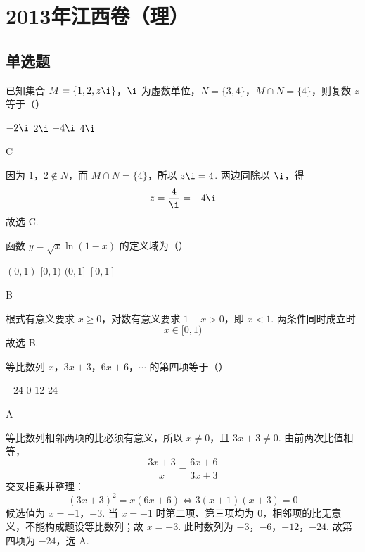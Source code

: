 \chapter{2013年江西卷（理）}

\section{单选题}

\begin{problem}
已知集合 \(M = \{1, 2, z\i\}\)，\(\i\) 为虚数单位，\(N = \{3, 4\}\)，\(M \cap N = \{4\}\)，则复数 \(z\) 等于（\quad）

\choices
    {\(-2\i\)}
    {\(2\i\)}
    {\(-4\i\)}
    {\(4\i\)}
\end{problem}

\begin{answer}
C
\end{answer}

\begin{solution}
因为 \(1\)，\(2\notin N\)，而 \(M\cap N=\{4\}\)，所以 \(z\i=4\). 两边同除以 \(\i\)，得
\[
z=\frac{4}{\i}=-4\i
\]
故选 C.
\end{solution}

\begin{problem}
函数 \( y = \sqrt{x} \ln (1 - x) \) 的定义域为（\quad）

\choices
    {\((0,1)\)}
    {\([0,1)\)}
    {\((0,1]\)}
    {\([0,1]\)}
\end{problem}

\begin{answer}
B
\end{answer}

\begin{solution}
根式有意义要求 \(x\geqslant0\)，对数有意义要求 \(1-x>0\)，即 \(x<1\). 两条件同时成立时
\[
x\in[0,1)
\]
故选 B.
\end{solution}

\begin{problem}
等比数列 \(x\)，\(3x + 3\)，\(6x + 6\)，\(\cdots\) 的第四项等于（\quad）

\choices
    {\(-24\)}
    {0}
    {12}
    {24}
\end{problem}

\begin{answer}
A
\end{answer}

\begin{solution}
等比数列相邻两项的比必须有意义，所以 \(x\ne0\)，且 \(3x+3\ne0\). 由前两次比值相等，
\[
\frac{3x+3}{x}=\frac{6x+6}{3x+3}
\]
交叉相乘并整理：
\[
(3x+3)^2=x(6x+6)
\Longleftrightarrow
3(x+1)(x+3)=0
\]
候选值为 \(x=-1\)，\(-3\). 当 \(x=-1\) 时第二项、第三项均为 \(0\)，相邻项的比无意义，不能构成题设等比数列；故 \(x=-3\). 此时数列为
\(-3\)，\(-6\)，\(-12\)，\(-24\).
故第四项为 \(-24\)，选 A.
\end{solution}

